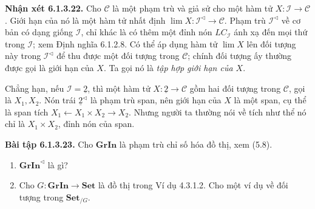 \noindent\textbf{Nhận xét 6.1.3.22.} Cho $\mathcal C$ là một phạm trù và giả sử cho một hàm tử $X:\mathcal I\to\mathcal C$. Giới hạn của nó là một hàm tử nhất định $\lim X:\mathcal I^{\triangleleft}\to\mathcal C$. Phạm trù $\mathcal I^{\triangleleft}$ về cơ bản có dạng giống $\mathcal I$, chỉ khác là có thêm một đỉnh nón $LC_{\mathcal I}$ ánh xạ đến mọi thứ trong $\mathcal I$; xem Định nghĩa 6.1.2.8. Có thể áp dụng hàm tử $\lim X$ lên đối tượng này trong $\mathcal I^{\triangleleft}$ để thu được một đối tượng trong $\mathcal C$; chính đối tượng ấy thường được gọi là giới hạn của $X$. Ta gọi nó là \emph{tập hợp giới hạn của $X$}.

Chẳng hạn, nếu $\mathcal I=\underline2$, thì một hàm tử $X:\underline2\to\mathcal C$ gồm hai đối tượng trong $\mathcal C$, gọi là $X_1,X_2$. Nón trái $\underline2^{\triangleleft}$ là phạm trù span, nên giới hạn của $X$ là một span, cụ thể là span tích $X_1\leftarrow X_1\times X_2\to X_2$. Nhưng người ta thường nói về tích như thể nó chỉ là $X_1\times X_2$, đỉnh nón của span.

\noindent\textbf{Bài tập 6.1.3.23.} Cho $\mathbf{GrIn}$ là phạm trù chỉ số hóa đồ thị, xem (5.8).
\begin{enumerate}[label=\alph*.]\item $\mathbf{GrIn}^{\triangleleft}$ là gì?\item Cho $G:\mathbf{GrIn}\to\mathbf{Set}$ là đồ thị trong Ví dụ 4.3.1.2. Cho một ví dụ về đối tượng trong $\mathbf{Set}_{/G}$.\end{enumerate}

